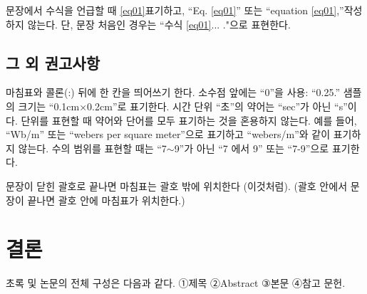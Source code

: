 \documentclass{fullpaper_hutech}
\begin{document}
문장에서 수식을 언급할 때 \eqref{eq01} 표기하고, ``Eq. \eqref{eq01}'' 또는 ``equation \eqref{eq01},''\로 작성하지 않는다. 단, 문장 처음인 경우는 ``수식 \eqref{eq01}\은 ... ."으로 표현한다.


\subsection{그 외 권고사항}

마침표와 콜론(:) 뒤에 한 칸을 띄어쓰기 한다. 소수점 앞에는 ``0''을 사용: ``0.25.'' 샘플의 크기는 ``0.1cm×0.2cm''로 표기한다. 시간 단위 ``초''의 약어는 ``sec''가 아닌 ``s''이다.  단위를 표현할 때 약어와 단어를 모두 표기하는 것을 혼용하지 않는다. 예를 들어, ``Wb/m'' 또는 ``webers per square meter''으로 표기하고 ``webers/m''와 같이 표기하지 않는다. 수의 범위를 표현할 때는 ``7$ \sim $9''가 아닌 ``7 에서 9'' 또는 ``7-9''으로 표기한다.

문장이 닫힌 괄호로 끝나면 마침표는 괄호 밖에 위치한다 (이것처럼). (괄호 안에서 문장이 끝나면 괄호 안에 마침표가 위치한다.)


\section{결론}

초록 및 논문의 전체 구성은 다음과 같다.
①제목 ②Abstract ③본문 ④참고 문헌.

\end{document}

